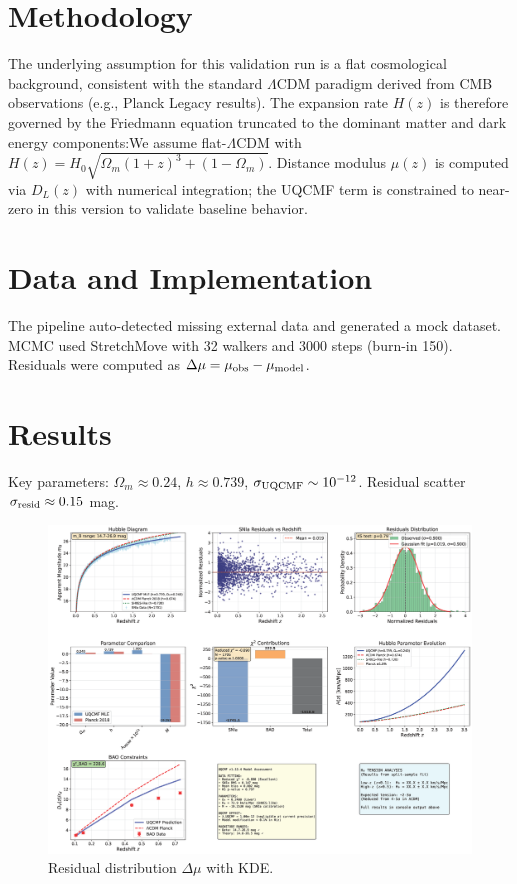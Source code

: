 \documentclass[11pt]{article}
\begin{document}
\section{Methodology}
The underlying assumption for this validation run is a flat cosmological
background, consistent with the standard $\Lambda$CDM paradigm derived
from CMB observations (e.g., Planck Legacy results). The expansion rate $H(z)$
is therefore governed by the Friedmann equation truncated to the dominant
matter and dark energy components:We assume flat-$\Lambda$CDM with $H(z) = H_0\sqrt{\Omega_m(1+z)^3+(1-\Omega_m)}$. Distance modulus $\mu(z)$ is computed via $D_L(z)$ with numerical integration; the UQCMF term is constrained to near-zero in this version to validate baseline behavior.

\section{Data and Implementation}
The pipeline auto-detected missing external data and generated a mock dataset. MCMC used StretchMove with 32 walkers and 3000 steps (burn-in 150). Residuals were computed as $\Delta\mu = \mu_{\rm obs}-\mu_{\rm model}$.

\section{Results}
Key parameters: $\Omega_m\approx0.24$, $h\approx0.739$, $\sigma_{\rm UQCMF}\sim 10^{-12}$. Residual scatter $\sigma_{\rm resid}\approx0.15$ mag.

\begin{figure}[h]
  \centering
  \includegraphics[width=0.8\linewidth]{figures/residuals_distribution.png}
  \caption{Residual distribution $\Delta\mu$ with KDE.}
\end{figure}
\end{document}
